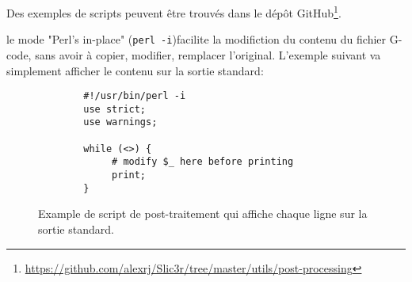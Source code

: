 Des exemples de scripts peuvent \^etre trouv\'es dans le d\'ep\^ot GitHub\footnote{\url{https://github.com/alexrj/Slic3r/tree/master/utils/post-processing}}.


le mode "Perl's in-place" (\texttt{perl -i})facilite la modifiction du contenu du fichier G-code, sans avoir \`a copier, modifier, remplacer l'original. L'exemple suivant va simplement afficher le contenu sur la sortie standard:

\begin{figure}[H]
\small
\begin{verbatim}
        #!/usr/bin/perl -i
        use strict;
        use warnings;

        while (<>) {
             # modify $_ here before printing
             print;
        }
\end{verbatim}
\caption{Example de script de post-traitement qui affiche chaque ligne sur la sortie standard.}
\label{fig:exaple_post_processing_script_print_lines}
\end{figure}

